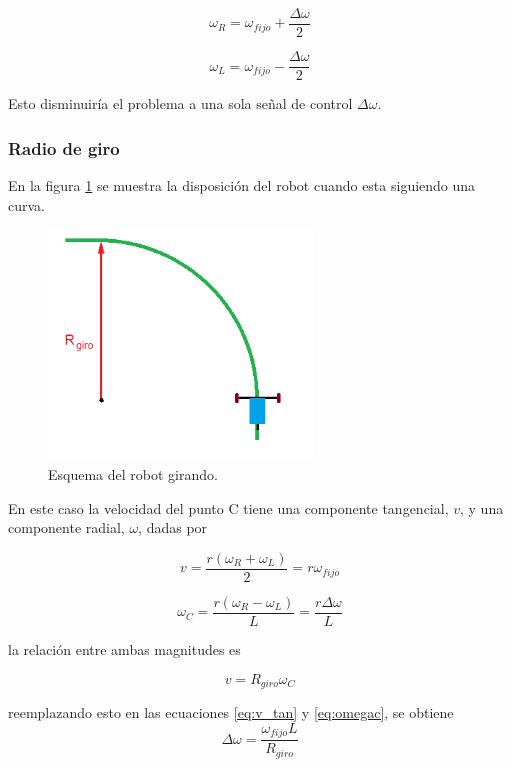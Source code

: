 \documentclass[10pt,conference,a4paper,onecolumn]{article}%
\begin{document}
\begin{equation*}
\omega _R = \omega _{fijo} + \frac{\Delta \omega}{2} 
\end{equation*}

\begin{equation*}
\omega _L = \omega _{fijo} -\frac{\Delta \omega}{2}
\end{equation*}

Esto disminuiría el problema a una sola señal de control $\Delta \omega$.

\subsubsection{Radio de giro}
En la figura \ref{fig:girando} se muestra la disposición del robot cuando esta siguiendo una curva.
\begin{figure}[h]
\centering
\includegraphics[width=7cm]{./imagenes/carrito_girando.png}
\caption{Esquema del robot girando.}
\label{fig:girando}
\end{figure}
En este caso la velocidad del punto C tiene una componente tangencial, $v$, y una componente radial, $\omega$, dadas por

\begin{equation}
v =\frac{r(\omega _R + \omega _L) }{2}=r \omega_{fijo}
\label{eq:v_tan}
\end{equation}

\begin{equation}
\omega_{C} =\frac{r(\omega _R - \omega _L) }{L}= \frac{  r \Delta \omega} {L}
\label{eq:omegac}
\end{equation}

 la relación entre ambas magnitudes es


\begin{equation*}
v=R_{giro} \omega_{C}
\end{equation*}

reemplazando esto en las ecuaciones \ref{eq:v_tan}  y \ref{eq:omegac}, se obtiene
\begin{equation}
\Delta \omega= \frac{\omega_{fijo}L}{R_{giro}}
\end{equation}
\end{document}
